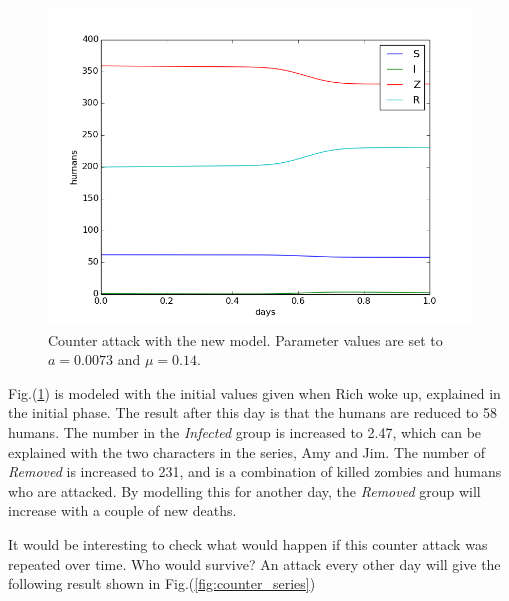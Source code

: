 \documentclass[%
twoside,                 %
final,                   %
chapterprefix=true,      %
open=right               %
10pt]{book}
\begin{document}
\begin{figure}[ht]
  \centerline{\includegraphics[width=0.9\linewidth]{1_fig/WD_zombie_counter_2.png}}
  \caption{
  \label{fig:zombie_counter_2} Counter attack with the new model. Parameter values are set to $a=0.0073$ and $\mu=0.14$.
  }
\end{figure}


Fig.(\ref{fig:zombie_counter_2}) is modeled with the initial values given when Rich woke up, explained in the initial phase. The result after this day is that the humans are reduced to 58 humans. The number in the \emph{Infected} group is increased to 2.47, which can be explained with the two characters in the series, Amy and Jim. The number of \emph{Removed} is increased to 231, and is a combination of killed zombies and humans who are attacked. By modelling this for another day, the \emph{Removed} group will increase with a couple of new deaths. 


\vspace{3mm}




\vspace{3mm}


It would be interesting to check what would happen if this counter attack was repeated over time. Who would survive? An attack every other day will give the following result shown in Fig.(\ref{fig:counter_series})
\end{document}
